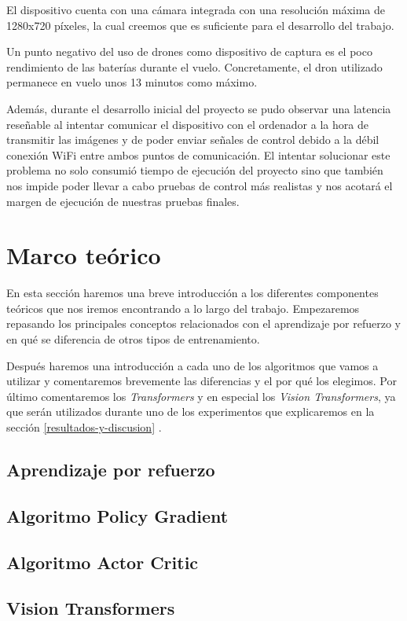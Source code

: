 El dispositivo cuenta con una cámara integrada con una resolución máxima de 1280x720 píxeles, la cual creemos que es suficiente para el desarrollo del trabajo.
\medskip

Un punto negativo del uso de drones como dispositivo de captura es el poco rendimiento de las baterías durante el vuelo. Concretamente, el dron utilizado permanece en vuelo unos 13 minutos como máximo.
\medskip

Además, durante el desarrollo inicial del proyecto se pudo observar una latencia reseñable al intentar comunicar el dispositivo con el ordenador a la hora de transmitir las imágenes y de poder enviar señales de control debido a la débil conexión WiFi entre ambos puntos de comunicación. El intentar solucionar este problema no solo consumió tiempo de ejecución del proyecto sino que también nos impide poder llevar a cabo pruebas de control más realistas y nos acotará el margen de ejecución de nuestras pruebas finales.
\medskip

\section{Marco teórico}

En esta sección haremos una breve introducción a los diferentes componentes teóricos que nos iremos encontrando a lo largo del trabajo. Empezaremos repasando los principales conceptos relacionados con el aprendizaje por refuerzo y en qué se diferencia de otros tipos de entrenamiento. 
\medskip

Después haremos una introducción a cada uno de los algoritmos que vamos a utilizar y comentaremos brevemente las diferencias y el por qué los elegimos.
Por último comentaremos los \textit{Transformers}\citep{transformers} y en especial los \textit{Vision Transformers}\citep{visiontransformers}, ya que serán utilizados durante uno de los experimentos que explicaremos en la sección \ref{resultados-y-discusion} .
\medskip

\subsection{Aprendizaje por refuerzo}
\label{aprendizaje-por-refuerzo}

\subsection{Algoritmo Policy Gradient}
\label{algoritmo-policy-gradient}

\subsection{Algoritmo Actor Critic}
\label{algoritmo-actor-critic}

\subsection{Vision Transformers}
\label{vision-transformers}
